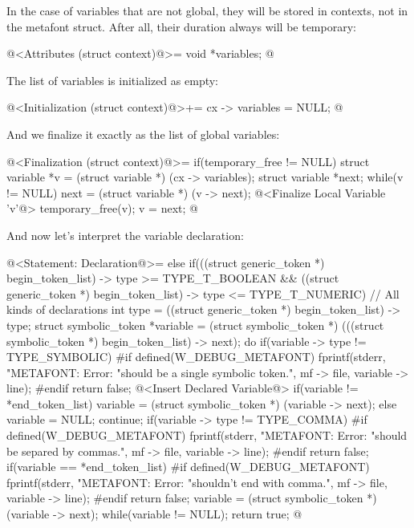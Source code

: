 In the case of variables that are not global, they will be stored in
contexts, not in the metafont struct. After all, their duration always
will be temporary:

\iniciocodigo
@<Attributes (struct context)@>=
  void *variables;
@
\fimcodigo

The list of variables is initialized as empty:

\iniciocodigo
@<Initialization (struct context)@>+=
cx -> variables = NULL;
@
\fimcodigo

And we finalize it exactly as the list of global variables:

\iniciocodigo
@<Finalization (struct context)@>=
if(temporary_free != NULL){
  struct variable *v = (struct variable *) (cx -> variables);
  struct variable *next;
  while(v != NULL){
    next = (struct variable *) (v -> next);
    @<Finalize Local Variable 'v'@>
    temporary_free(v);
    v = next;
  }
}
@
\fimcodigo

And now let's interpret the variable declaration:

\iniciocodigo
@<Statement: Declaration@>=
else if(((struct generic_token *) begin_token_list) -> type >=
        TYPE_T_BOOLEAN &&
        ((struct generic_token *) begin_token_list) -> type <=
        TYPE_T_NUMERIC){ // All kinds of declarations
  int type = ((struct generic_token *) begin_token_list) -> type;
  struct symbolic_token *variable = (struct symbolic_token *)
           (((struct symbolic_token *) begin_token_list) -> next);
  do{
    if(variable -> type != TYPE_SYMBOLIC){
#if defined(W_DEBUG_METAFONT)
      fprintf(stderr, "METAFONT: Error: %
                    "should be a single symbolic token.\n", mf -> file,
                    variable -> line);
#endif
      return false;
    }
    @<Insert Declared Variable@>
    if(variable != *end_token_list)
      variable = (struct symbolic_token *) (variable -> next);
    else{
      variable = NULL;
      continue;
    }
    if(variable -> type != TYPE_COMMA){
#if defined(W_DEBUG_METAFONT)
      fprintf(stderr, "METAFONT: Error: %
                    "should be separed by commas.\n", mf -> file,
                    variable -> line);
#endif
      return false;
    }
    if(variable == *end_token_list){
#if defined(W_DEBUG_METAFONT)
      fprintf(stderr, "METAFONT: Error: %
                    "shouldn't end with comma.\n", mf -> file,
                    variable -> line);
#endif
      return false;
    }
    variable = (struct symbolic_token *) (variable -> next);
  } while(variable != NULL);
  return true;
}
@
\fimcodigo

